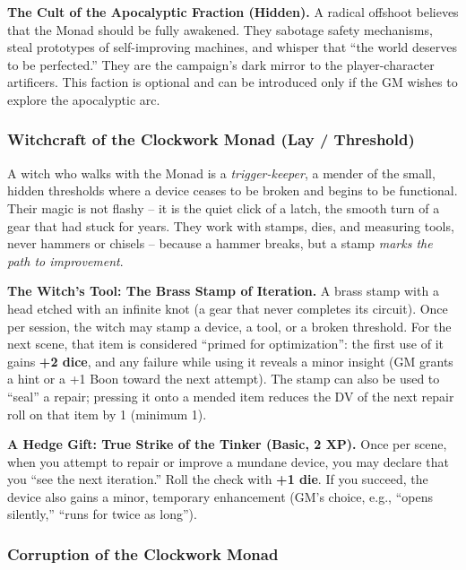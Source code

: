 \textbf{The Cult of the Apocalyptic Fraction (Hidden).} A radical offshoot believes that the Monad should be fully awakened. They sabotage safety mechanisms, steal prototypes of self-improving machines, and whisper that ``the world deserves to be perfected.'' They are the campaign's dark mirror to the player-character artificers. This faction is optional and can be introduced only if the GM wishes to explore the apocalyptic arc.

\subsubsection*{Witchcraft of the Clockwork Monad (Lay / Threshold)}

A witch who walks with the Monad is a \textit{trigger-keeper}, a mender of the small, hidden thresholds where a device ceases to be broken and begins to be functional. Their magic is not flashy -- it is the quiet click of a latch, the smooth turn of a gear that had stuck for years. They work with stamps, dies, and measuring tools, never hammers or chisels -- because a hammer breaks, but a stamp \textit{marks the path to improvement}.

\textbf{The Witch's Tool: The Brass Stamp of Iteration.} A brass stamp with a head etched with an infinite knot (a gear that never completes its circuit). Once per session, the witch may stamp a device, a tool, or a broken threshold. For the next scene, that item is considered ``primed for optimization'': the first use of it gains \textbf{+2 dice}, and any failure while using it reveals a minor insight (GM grants a hint or a +1 Boon toward the next attempt). The stamp can also be used to ``seal'' a repair; pressing it onto a mended item reduces the DV of the next repair roll on that item by 1 (minimum 1).

\textbf{A Hedge Gift: True Strike of the Tinker (Basic, 2 XP).} Once per scene, when you attempt to repair or improve a mundane device, you may declare that you ``see the next iteration.'' Roll the check with \textbf{+1 die}. If you succeed, the device also gains a minor, temporary enhancement (GM's choice, e.g., ``opens silently,'' ``runs for twice as long'').

\subsubsection*{Corruption of the Clockwork Monad}

